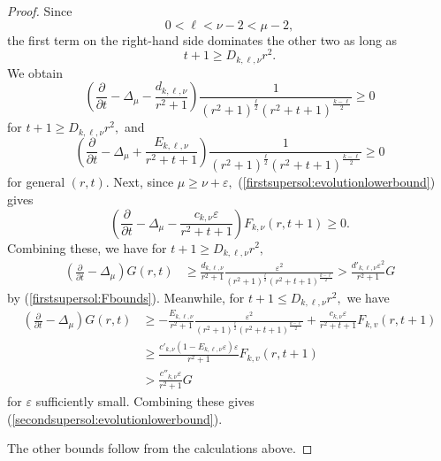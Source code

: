 \documentclass[12pt]{amsart}
\newcommand{\p}{{ \partial}}
\renewcommand{\1}{{\mathbf 1}}
\renewcommand{\p}{{\partial}}
\newcommand{\eps}{{\varepsilon}}
\theoremstyle{others}
\numberwithin{equation}{section}
\begin{document}
\begin{proof}
Since
$$0 < \ell  < \nu - 2 < \mu - 2,$$
the first term on the right-hand side dominates the other two as long as
$$t + 1 \geq D_{k,\ell, \nu} r^2.$$
We obtain
\begin{equation*}
\left( \frac{\p}{\p t} - \Delta_\mu - \frac{d_{k, \ell, \nu}}{r^2 + 1} \right) \frac{1}{(r^2 + 1)^{\frac{\ell }{2}} (r^2 + t + 1)^{\frac{k - \ell }{2} } } \geq 0 
\end{equation*}
for $t + 1 \geq D_{k,\ell, \nu} r^2,$ and
\begin{equation*}
\left( \frac{\p}{\p t} - \Delta_\mu + \frac{E_{k, \ell, \nu}}{r^2 + t + 1} \right) \frac{1}{(r^2 + 1)^{\frac{\ell }{2}} (r^2 + t + 1)^{\frac{k - \ell }{2} } } \geq 0 %
\end{equation*}
for general $(r,t).$ 
Next, since $\mu \geq \nu + \eps,$ (\ref{firstsupersol:evolutionlowerbound}) gives
\begin{equation*}
\left( \frac{\p}{\p t} - \Delta_\mu - \frac{c_{k, \nu} \eps}{r^2 + t + 1} \right) F_{k, \nu}(r,t+1) \geq 0.
\end{equation*}
Combining these, we have for $t + 1 \geq D_{k,\ell, \nu} r^2,$
\begin{equation*}
\begin{split}
\left( \frac{\p}{\p t} - \Delta_\mu \right) G(r,t) & \geq \frac{d_{k,\ell,\nu}}{r^2 + 1} \frac{\eps^2}{ (r^2 + 1)^{\frac{\ell }{2}} (r^2 + t + 1)^{\frac{k - \ell }{2} }} > \frac{d'_{k,\ell,\nu} \eps^2}{r^2 + 1} G
\end{split}
\end{equation*}
by (\ref{firstsupersol:Fbounds}). Meanwhile, for $t + 1 \leq D_{k,\ell,\nu}r^2,$ we have
\begin{equation*}
\begin{split}
\left( \frac{\p}{\p t} - \Delta_\mu \right) G(r,t) & \geq -\frac{E_{k,\ell,\nu}}{r^2 + 1} \frac{\eps^2}{ (r^2 + 1)^{\frac{\ell }{2}} (r^2 + t + 1)^{\frac{k - \ell }{2} }} + \frac{c_{k,\nu} \eps}{r^2 + t + 1} F_{k,v}(r, t + 1) \\
& \geq \frac{c'_{k,\nu} \left( 1 -E_{k,\ell,\nu} \eps \right) \eps}{r^2 + 1}  F_{k,v}(r, t + 1) \\
& > \frac{c''_{k,\nu} \eps}{r^2 + 1} G
\end{split}
\end{equation*}
for $\eps$ sufficiently small. Combining these gives (\ref{secondsupersol:evolutionlowerbound}).


The other bounds follow from the calculations above.
\end{proof}
\end{document}
